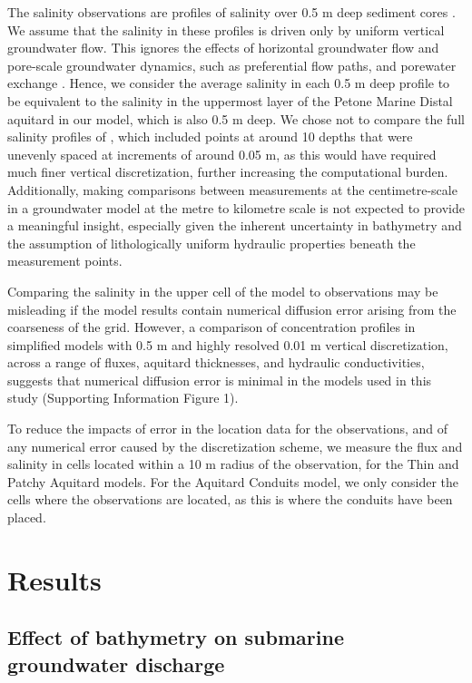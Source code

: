 \documentclass[pdflatex,sn-apa]{sn-jnl}%
\begin{document}
The salinity observations are profiles of salinity over 0.5 m deep sediment cores \citep{hoffmann_fresh_2023}.
We assume that the salinity in these profiles is driven only by uniform vertical groundwater flow.
This ignores the effects of horizontal groundwater flow and pore-scale groundwater dynamics, such as preferential flow paths, and porewater exchange \citep{taniguchi_submarine_2019}.
Hence, we consider the average salinity in each 0.5 m deep profile to be equivalent to the salinity in the uppermost layer of the Petone Marine Distal aquitard in our model,
which is also 0.5 m deep. We chose not to compare the full salinity profiles of \cite{hoffmann_fresh_2023}, which included points at around 10 depths that were unevenly spaced at increments of around 0.05 m,
as this would have required much finer vertical discretization, further increasing the computational burden.
Additionally, making comparisons between measurements at the centimetre-scale in a groundwater model at the metre to kilometre scale is not expected to provide a meaningful insight,
especially given the inherent uncertainty in bathymetry and the assumption of lithologically uniform hydraulic properties beneath the measurement points.

Comparing the salinity in the upper cell of the model to observations may be misleading if the model results contain numerical diffusion error arising from the coarseness of the grid.
However, a comparison of concentration profiles in simplified models with 0.5 m and highly resolved 0.01 m vertical discretization, across a range of fluxes, aquitard thicknesses, and hydraulic conductivities,
suggests that numerical diffusion error is minimal in the models used in this study (Supporting Information Figure 1).

To reduce the impacts of error in the location data for the observations, and of any numerical error caused by the discretization scheme,
we measure the flux and salinity in cells located within a 10 m radius of the observation, for the Thin and Patchy Aquitard models.
For the Aquitard Conduits model, we only consider the cells where the observations are located, as this is where the conduits have been placed.


\section{Results}

\subsection{Effect of bathymetry on submarine groundwater discharge}
\end{document}
